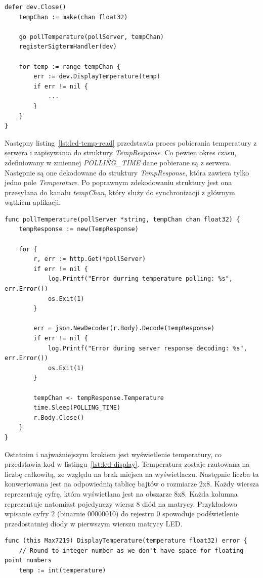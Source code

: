 \documentclass[12pt]{report}
\begin{document}
{\begin{lstlisting}[language=golang,caption=Konfiguracja aplikacji,label=lst:led-config]
	defer dev.Close()
	tempChan := make(chan float32)
	
	go pollTemperature(pollServer, tempChan)
	registerSigtermHandler(dev)
	
	for temp := range tempChan {
		err := dev.DisplayTemperature(temp)
		if err != nil {
			...
		}
	}
}
\end{lstlisting}

\newpage
\noindent Następny listing~\ref{lst:led-temp-read} przedstawia proces pobierania temperatury z serwera i zapisywania do struktury \textit{TempResponse}. Co pewien okres czasu, zdefiniowany w zmiennej \textit{POLLING\_TIME} dane pobierane są z serwera. Następnie są one dekodowane do struktury \textit{TempResponse}, która zawiera tylko jedno pole \textit{Temperature}. Po poprawnym zdekodowaniu struktury jest ona przesyłana do kanału \textit{tempChan}, który służy do synchronizacji z głównym wątkiem aplikacji.
\begin{lstlisting}[language=golang,caption=Odczyt temperatury z serwera,label=lst:led-temp-read]
func pollTemperature(pollServer *string, tempChan chan float32) {
	tempResponse := new(TempResponse)

	for {
		r, err := http.Get(*pollServer)
		if err != nil {
			log.Printf("Error durring temperature polling: %s", err.Error())
			os.Exit(1)
		}

		err = json.NewDecoder(r.Body).Decode(tempResponse)
		if err != nil {
			log.Printf("Error during server response decoding: %s", err.Error())
			os.Exit(1)
		}

		tempChan <- tempResponse.Temperature
		time.Sleep(POLLING_TIME)
		r.Body.Close()
	}
}
\end{lstlisting}

\newpage
\noindent Ostatnim i najważniejszym krokiem jest wyświetlenie temperatury, co przedstawia kod w listingu~\ref{lst:led-display}. Temperatura zostaje rzutowana na liczbę całkowitą, ze względu na brak miejsca na wyświetlaczu. Następnie liczba ta konwertowana jest na odpowiednią tablicę bajtów o rozmiarze 2x8. Każdy wiersza reprezentuję cyfrę, która wyświetlana jest na obszarze 8x8. Każda kolumna reprezentuje natomiast pojedynczy wiersz 8 diód na matrycy. Przykładowo wpisanie cyfry 2 (binarnie 00000010) do rejestru 0 spowoduje podświetlenie przedostatniej diody w pierwszym wierszu matrycy LED.
\begin{lstlisting}[language=golang,caption=Wyświetlanie temperatury,label=lst:led-display]
func (this Max7219) DisplayTemperature(temperature float32) error {
	// Round to integer number as we don't have space for floating point numbers
	temp := int(temperature)


\end{lstlisting}}
\end{document}
